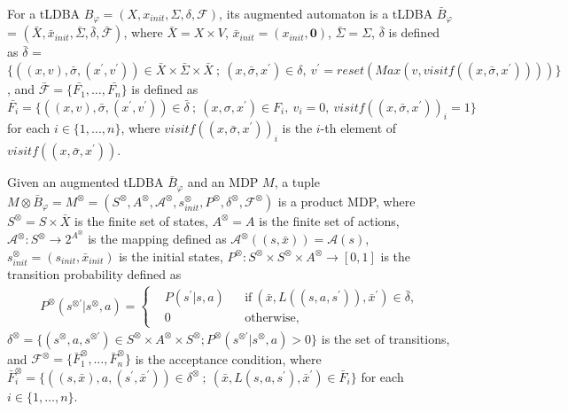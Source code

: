 \documentclass[a4j,12pt,oneside,openany,english,dvipdfmx]{jsbook}
\begin{document}
\begin{definition}
   For a tLDBA $B_{\varphi} = (X,x_{init},\Sigma,\delta,\mathcal{F})$, its augmented automaton is a tLDBA $\bar{B}_{\varphi}$ = $(\bar{X},\bar{x}_{init},\bar{\Sigma},\bar{\delta},\bar{\mathcal{F}})$, where $\bar{X} = X\times V$, $\bar{x}_{init} = (x_{init}, \bm{0})$, $\bar{\Sigma} = \Sigma$, $\bar{\delta}$ is defined as $\bar{\delta}$ = $\{ ((x,v), \bar{\sigma}, (x^{\prime},v^{\prime})) \in \bar{X} \times \bar{\Sigma} \times \bar{X}\ ;\ (x,\bar{\sigma},x^{\prime}) \in \delta,\ v^{\prime} = reset(Max(v,visitf((x,\bar{\sigma},x^{\prime})))) \}$, and $\mathcal{\bar{F}} = \{ \bar{F_1}, \ldots ,\bar{F_n} \}$ is defined as $\bar{F_i} = \{ ((x,v), \bar{\sigma}, (x^{\prime},v^{\prime})) \in \bar{\delta}\ ;\ (x, \sigma, x^{\prime}) \in F_i,\ v_i = 0,\ visitf((x, \bar{\sigma}, x^{\prime}))_i = 1\}$ for each $ i \in \{1,...,n\}$, where $visitf((x, \bar{\sigma}, x^{\prime}))_i$ is the $i$-th element of $visitf((x, \bar{\sigma}, x^{\prime}))$.
\end{definition}

\begin{definition}
  Given an augmented tLDBA $\bar{B}_{\varphi}$ and an MDP $M$, a tuple $M \otimes \bar{B}_{\varphi} = M^{\otimes} = (S^{\otimes}, A^{\otimes}, {\mathcal A}^{\otimes}, s_{init}^{\otimes}, P^{\otimes}, \delta^{\otimes}, {\mathcal F}^{\otimes})$ is a product MDP, where
  $S^{\otimes} = S \times \bar{X}$ is the finite set of states, $A^{\otimes}=A$ is the finite set of actions, ${\mathcal A}^{\otimes} : S^{\otimes} \rightarrow 2^{A^{\otimes}}$ is the mapping defined as ${\mathcal A}^{\otimes}((s,\bar{x})) = {\mathcal A}(s)$, $s_{init}^{\otimes} = (s_{init},\bar{x}_{init})$ is the initial states, $P^{\otimes} : S^{\otimes} \times S^{\otimes} \times A^{\otimes} \rightarrow [0,1]$ is the transition probability defined as
  \begin{align}
    P^{\otimes}(s^{\otimes \prime} | s^{\otimes}, a) =
    \left\{
    \begin{aligned}
      &P(s^{\prime} | s, a) &   &\text{if}\  (\bar{x}, L((s,a,s^{\prime})), \bar{x}^{\prime}) \in \bar{\delta},\\
      &0 &   &\text{otherwise} ,
    \end{aligned}
    \right. \nonumber
  \end{align}
  $\delta^{\otimes} = \{ (s^{\otimes}, a, s^{\otimes \prime}) \in S^{\otimes} \times A^{\otimes} \times S^{\otimes} ; P^{\otimes}(s^{\otimes \prime} | s^{\otimes}, a) > 0 \}$ is the set of transitions, and ${\mathcal F}^{\otimes} = \{ \bar{F}^{\otimes}_1, \ldots ,\bar{F}^{\otimes}_n \}$ is the acceptance condition, where $\bar{F}^{\otimes}_i = \{ ((s,\bar{x}), a, (s^{\prime}, \bar{x}^{\prime})) \in \delta^{\otimes}\ ;\ (\bar{x}, L(s,a,s^{\prime}), \bar{x}^{\prime}) \in \bar{F}_i \}$ for each $ i \in \{ 1, \ldots ,n \}$.
\end{definition}
\end{document}
